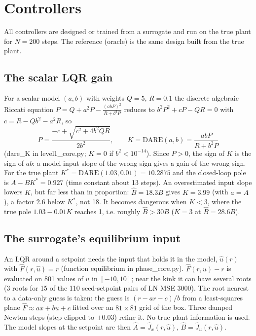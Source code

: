 \documentclass[11pt]{article}
\begin{document}
\section{Controllers}\label{sec:ctrl}

All controllers are designed or trained from a surrogate and run on the true plant for $N=200$ steps. The reference (oracle) is the same design built from the true plant.

\subsection{The scalar LQR gain}
For a scalar model $(a,b)$ with weights $Q=5$, $R=0.1$ the discrete algebraic Riccati equation $P = Q + a^2P - \frac{(abP)^2}{R+b^2P}$ reduces to $b^2P^2 + cP - QR = 0$ with $c = R - Qb^2 - a^2R$, so
\begin{equation}
P = \frac{-c+\sqrt{c^2+4b^2QR}}{2b^2},\qquad K = \mathrm{DARE}(a,b) = \frac{abP}{R+b^2P}
\end{equation}
(dare\_K in level1\_core.py; $K=0$ if $b^2<10^{-14}$). Since $P>0$, the sign of $K$ is the sign of $ab$: a model input slope of the wrong sign gives a gain of the wrong sign. For the true plant $K^*=\mathrm{DARE}(1.03,0.01)=10.2875$ and the closed-loop pole is $A-BK^*=0.927$ (time constant about 13 steps). An overestimated input slope lowers $K$, but far less than in proportion: $\hat B=18.3B$ gives $K=3.99$ (with $a=A$), a factor 2.6 below $K^*$, not 18. It becomes dangerous when $K<3$, where the true pole $1.03-0.01K$ reaches 1, i.e. roughly $\hat B>30B$ ($K=3$ at $\hat B=28.6B$).

\subsection{The surrogate's equilibrium input}
An LQR around a setpoint needs the input that holds it in the model, $\hat u(r)$ with $\hat F(r,\hat u)=r$ (function equilibrium in phase\_core.py). $\hat F(r,u)-r$ is evaluated on 801 values of $u$ in $[-10,10]$; near the kink it can have several roots (3 roots for 15 of the 110 seed-setpoint pairs of LN MSE 3000). The root nearest to a data-only guess is taken: the guess is $(r-ar-c)/b$ from a least-squares plane $\hat F\approx ax+bu+c$ fitted over an $81\times81$ grid of the box. Three damped Newton steps (step clipped to $\pm0.03$) refine it. No true-plant information is used. The model slopes at the setpoint are then $\hat A=\hat J_x(r,\hat u)$, $\hat B=\hat J_u(r,\hat u)$.
\end{document}
